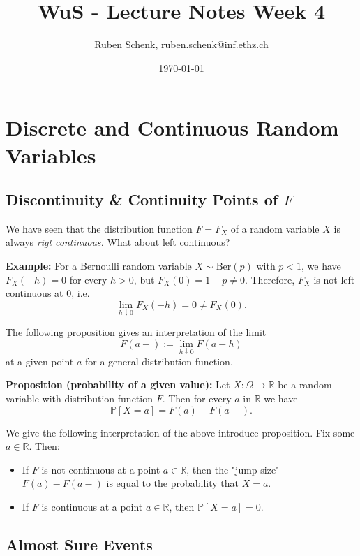 \documentclass[a4paper]{extarticle}
\title{WuS - Lecture Notes Week 4}
\author{Ruben Schenk, ruben.schenk@inf.ethz.ch}
\date{\today}
\begin{document}
\maketitle

\section{Discrete and Continuous Random Variables}

\subsection{Discontinuity \& Continuity Points of \(F\)}

We have seen that the distribution function \(F = F_X\) of a random variable \(X\) is always \textit{rigt continuous.} What about left continuous?

\begin{ebox}
    \textbf{Example:} For a Bernoulli random variable \(X \sim \text{Ber}(p)\) with \(p < 1\), we have \(F_X(-h) = 0\) for every \(h > 0\), but \(F_X(0) = 1 - p \neq 0\). Therefore, \(F_X\) is not left continuous at \(0\), i.e.
    \[
        \lim_{h \downarrow 0} F_X(-h) = 0 \neq F_X(0).
    \]
\end{ebox}

The following proposition gives an interpretation of the limit
\[
    F(a-) := \lim_{h \downarrow 0} F(a - h)
\]
at a given point \(a\) for a general distribution function.

\begin{cbox}
    \textbf{Proposition (probability of a given value):} Let \(X : \Omega \to \mathbb{R}\) be a random variable with distribution function \(F\). Then for every \(a\) in \(\mathbb{R}\) we have
    \[
        \mathbb{P}[X = a] = F(a) - F(a -).
    \]
\end{cbox}

We give the following interpretation of the above introduce proposition. Fix some \(a \in \mathbb{R}\). Then:

\begin{itemize}
    \item If \(F\) is not continuous at a point \(a \in \mathbb{R}\), then the "jump size" \(F(a) - F(a -)\) is equal to the probability that \(X = a\).
    \item If \(F\) is continuous at a point \(a \in \mathbb{R}\), then \(\mathbb{P}[X = a] = 0\).
\end{itemize}

\subsection{Almost Sure Events}
\end{document}
